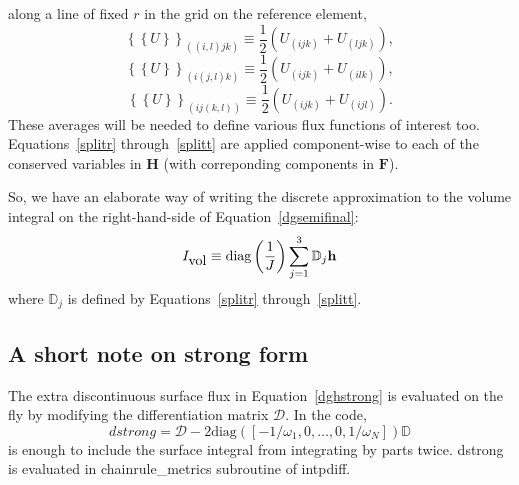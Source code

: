 along a line of fixed $r$ in the grid on the reference element,
\begin{equation}
\left\{\left\{U\right\}\right\}_{((i,l)jk)}\equiv\frac{1}{2}\left(U_{(ijk)}+U_{(ljk)}\right),
\label{avgr}
\end{equation}
\begin{equation}
\left\{\left\{U\right\}\right\}_{(i(j,l)k)}\equiv\frac{1}{2}\left(U_{(ijk)}+U_{(ilk)}\right),
\label{avgs}
\end{equation}
\begin{equation}
\left\{\left\{U\right\}\right\}_{(ij(k,l))}\equiv\frac{1}{2}\left(U_{(ijk)}+U_{(ijl)}\right).
\label{avgt}
\end{equation}
These averages will be needed to define various flux functions of interest too. Equations~\ref{splitr} through~\ref{splitt} are applied component-wise to each of the conserved variables in
$\mathbf{H}$ (with correponding components in $\mathbf{F}$).

So, we have an elaborate way of writing the discrete approximation to the
volume integral on the right-hand-side of Equation~\ref{dgsemifinal}:
\begin{equation}
I_{\mbox{vol}}\equiv \mbox{diag}\left(\frac{1}{J}\right)\sum_{j=1}^3\mathbb{D}_j{\bf h}
\label{shortvol}
\end{equation}
where $\mathbb{D}_j$ is defined by Equations~\ref{splitr} through~\ref{splitt}.

\subsection{A short note on strong form}
The extra discontinuous surface flux in Equation~\ref{dghstrong} is evaluated
on the fly by modifying the differentiation matrix $\mathcal{D}$. In the
code,
\begin{equation}
dstrong=\mathcal{D}-2\mbox{diag}\left(\left[-1/\omega_1,0,\dots,0,1/\omega_N\right]\right)\mathbb{D}
\label{dstrong}
\end{equation}
is enough to include the surface integral from integrating by parts twice. dstrong
is evaluated in chainrule\_metrics subroutine of intpdiff.

